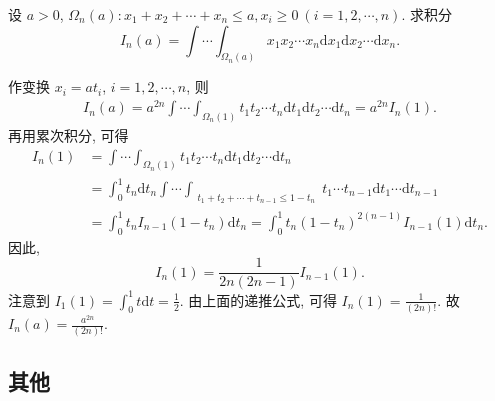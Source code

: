 \documentclass[../../main.tex]{subfiles}
\begin{document}
\begin{example}
设 \( a > 0 \), \( \Omega_n(a) : x_1 + x_2 + \cdots + x_n \leqslant a, x_i \geqslant 0\ (i = 1,2,\cdots,n) \). 求积分
\[
I_n(a) = \int \cdots \int_{\Omega_n(a)} x_1 x_2 \cdots x_n \mathrm{d}x_1 \mathrm{d}x_2 \cdots \mathrm{d}x_n.
\]
\end{example}
\begin{solution}
作变换 \( x_i = a t_i \), \( i = 1,2,\cdots,n \), 则
\begin{align*}
I_n(a) = a^{2n} \int \cdots \int_{\Omega_n(1)} t_1 t_2 \cdots t_n \mathrm{d}t_1 \mathrm{d}t_2 \cdots \mathrm{d}t_n = a^{2n} I_n(1).
\end{align*}
再用累次积分, 可得
\begin{align*}
I_n(1) &= \int \cdots \int_{\Omega_n(1)} t_1 t_2 \cdots t_n \mathrm{d}t_1 \mathrm{d}t_2 \cdots \mathrm{d}t_n
\\
&= \int_0^1 t_n \mathrm{d}t_n \int \cdots \int_{\substack{t_1 + t_2 + \cdots + t_{n-1} \leqslant 1 - t_n}} t_1 \cdots t_{n-1} \mathrm{d}t_1 \cdots \mathrm{d}t_{n-1}
\\
&= \int_0^1 t_n I_{n-1}(1 - t_n) \mathrm{d}t_n = \int_0^1 t_n (1 - t_n)^{2(n-1)} I_{n-1}(1) \mathrm{d}t_n.
\end{align*}
因此,
\[
I_n(1) = \frac{1}{2n(2n - 1)} I_{n-1}(1).
\]
注意到 \( I_1(1) = \int_0^1 t \mathrm{d}t = \frac{1}{2} \). 由上面的递推公式, 可得 \( I_n(1) = \frac{1}{(2n)!} \). 故 \( I_n(a) = \frac{a^{2n}}{(2n)!} \).

\end{solution}












\subsection{其他}
\end{document}
